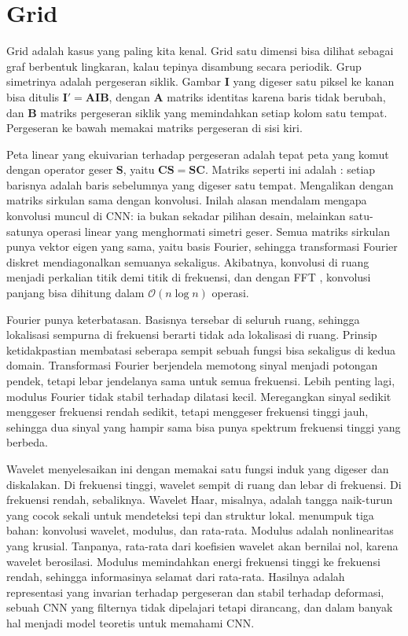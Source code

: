 \section{Grid}

Grid adalah kasus yang paling kita kenal. Grid satu dimensi bisa dilihat sebagai graf berbentuk
lingkaran, kalau tepinya disambung secara periodik. Grup simetrinya adalah pergeseran siklik.
Gambar $\bm I$ yang digeser satu piksel ke kanan bisa ditulis $\bm I'=\bm A\bm I\bm B$, dengan
$\bm A$ matriks identitas karena baris tidak berubah, dan $\bm B$ matriks pergeseran siklik yang
memindahkan setiap kolom satu tempat. Pergeseran ke bawah memakai matriks pergeseran di sisi kiri.

Peta linear yang ekuivarian terhadap pergeseran adalah tepat peta yang komut dengan operator
geser $\bm S$, yaitu $\bm C\bm S=\bm S\bm C$. Matriks seperti ini adalah :
setiap barisnya adalah baris sebelumnya yang digeser satu tempat. Mengalikan dengan matriks
sirkulan sama dengan konvolusi. Inilah alasan mendalam mengapa konvolusi muncul di CNN: ia
bukan sekadar pilihan desain, melainkan satu-satunya operasi linear yang menghormati simetri geser.
Semua matriks sirkulan punya vektor eigen yang sama, yaitu basis Fourier, sehingga transformasi
Fourier diskret mendiagonalkan semuanya sekaligus. Akibatnya, konvolusi di ruang menjadi perkalian
titik demi titik di frekuensi, dan dengan FFT \citep{cooley1965}, konvolusi panjang bisa dihitung
dalam $\mathcal O(n\log n)$ operasi.

Fourier punya keterbatasan. Basisnya tersebar di seluruh ruang, sehingga lokalisasi sempurna di
frekuensi berarti tidak ada lokalisasi di ruang. Prinsip ketidakpastian membatasi seberapa sempit
sebuah fungsi bisa sekaligus di kedua domain. Transformasi Fourier berjendela memotong sinyal
menjadi potongan pendek, tetapi lebar jendelanya sama untuk semua frekuensi. Lebih penting lagi,
modulus Fourier tidak stabil terhadap dilatasi kecil. Meregangkan sinyal sedikit menggeser
frekuensi rendah sedikit, tetapi menggeser frekuensi tinggi jauh, sehingga dua sinyal yang hampir
sama bisa punya spektrum frekuensi tinggi yang berbeda.

Wavelet menyelesaikan ini dengan memakai satu fungsi induk yang digeser dan diskalakan. Di
frekuensi tinggi, wavelet sempit di ruang dan lebar di frekuensi. Di frekuensi rendah, sebaliknya.
Wavelet Haar, misalnya, adalah tangga naik-turun yang cocok sekali untuk mendeteksi tepi dan
struktur lokal.  \citep{mallat2012} menumpuk tiga bahan: konvolusi
wavelet, modulus, dan rata-rata. Modulus adalah nonlinearitas yang krusial. Tanpanya, rata-rata
dari koefisien wavelet akan bernilai nol, karena wavelet berosilasi. Modulus memindahkan energi
frekuensi tinggi ke frekuensi rendah, sehingga informasinya selamat dari rata-rata. Hasilnya adalah
representasi yang invarian terhadap pergeseran dan stabil terhadap deformasi, sebuah CNN yang
filternya tidak dipelajari tetapi dirancang, dan dalam banyak hal menjadi model teoretis untuk
memahami CNN.


